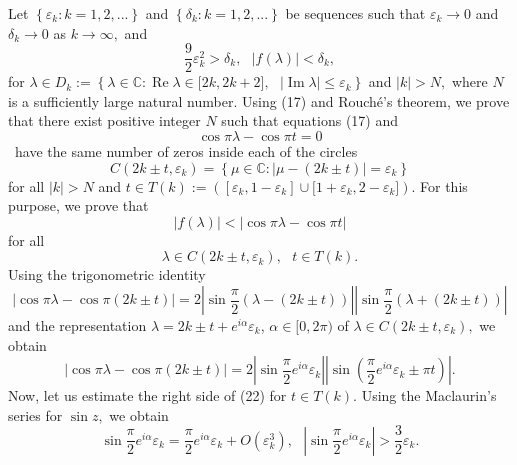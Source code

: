 \documentclass{article}%
\begin{document}
Let $\left\{  \varepsilon_{k}:k=1,2,...\right\}  $ and $\left\{  \delta
_{k}:k=1,2,...\right\}  $ be sequences such that $\varepsilon_{k}\rightarrow0$
and $\delta_{k}\rightarrow0$ as $k\rightarrow\infty,$ and
\begin{equation}
\frac{9}{2}\varepsilon_{k}^{2}>\delta_{k},\text{ }\left\vert f(\lambda
)\right\vert <\delta_{k}, \tag{18}%
\end{equation}
for $\lambda\in D_{k}:=\left\{  \lambda\in\mathbb{C}:\operatorname{Re}%
\lambda\in\lbrack2k,2k+2],\text{ }\left\vert \operatorname{Im}\lambda
\right\vert \leq\varepsilon_{k}\right\}  $ and $\left\vert k\right\vert >N,$
where $N$ is a sufficiently large natural number. Using (17) and Rouch\'{e}'s
theorem, we prove that there exist positive integer $N$ such that equations
(17) and%
\begin{equation}
\cos\pi\lambda-\cos\pi t=0 \tag{19}%
\end{equation}
\ have the same number of zeros inside each of the circles
\[
C(2k\pm t,\varepsilon_{k})=\left\{  \mu\in\mathbb{C}:\left\vert \mu-(2k\pm
t)\right\vert =\varepsilon_{k}\right\}
\]
for all $\left\vert k\right\vert >N$ and $t\in T(k):=\left(  [\varepsilon
_{k},1-\varepsilon_{k}]\cup\lbrack1+\varepsilon_{k},2-\varepsilon_{k}]\right)
.$ For this purpose, we prove that
\begin{equation}
\left\vert f(\lambda)\right\vert <\left\vert \cos\pi\lambda-\cos\pi
t\right\vert \tag{20}%
\end{equation}
for all%
\begin{equation}
\lambda\in C(2k\pm t,\varepsilon_{k}),\text{ }t\in T(k). \tag{21}%
\end{equation}
Using the trigonometric identity
\[
\left\vert \cos\pi\lambda-\cos\pi(2k\pm t)\right\vert =2\left\vert \sin
\frac{\pi}{2}(\lambda-(2k\pm t))\right\vert \left\vert \sin\frac{\pi}%
{2}(\lambda+(2k\pm t))\right\vert
\]
and the representation $\lambda=2k\pm t+e^{i\alpha}\varepsilon_{k}$,
$\alpha\in\lbrack0,2\pi)$ of $\lambda\in C(2k\pm t,\varepsilon_{k}),$ we
obtain
\begin{equation}
\left\vert \cos\pi\lambda-\cos\pi(2k\pm t)\right\vert =2\left\vert \sin
\frac{\pi}{2}e^{i\alpha}\varepsilon_{k}\right\vert \left\vert \sin(\frac{\pi
}{2}e^{i\alpha}\varepsilon_{k}\pm\pi t)\right\vert . \tag{22}%
\end{equation}
Now, let us estimate the right side of (22) for $t\in T(k).$ Using the
Maclaurin's series for $\sin z,$ we obtain
\begin{equation}
\sin\frac{\pi}{2}e^{i\alpha}\varepsilon_{k}=\frac{\pi}{2}e^{i\alpha
}\varepsilon_{k}+O(\varepsilon_{k}^{3}),\text{ }\left\vert \sin\frac{\pi}%
{2}e^{i\alpha}\varepsilon_{k}\right\vert >\frac{3}{2}\varepsilon_{k}. \tag{23}%
\end{equation}
\end{document}
